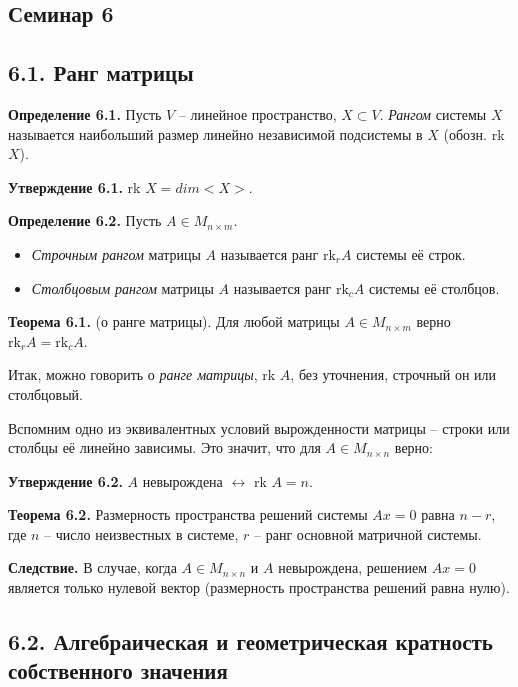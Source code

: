 \documentclass[a4paper, 12pt]{article}
\begin{document}
\begin{spacing}{1.5}
\setlength{\parindent}{0ex}

\section*{Семинар 6}


\subsection*{6.1. Ранг матрицы}

\textbf{Определение 6.1.} Пусть $V$ -- линейное пространство, $X \subset V$. \textit{Рангом} системы $X$ называется наибольший размер линейно независимой подсистемы в $X$ (обозн. rk $X$).

\textbf{Утверждение 6.1.} rk $X = dim <X>$.

\textbf{Определение 6.2.} Пусть $A \in M_{n \times m}$.
\begin{itemize}[noitemsep]
    \item \textit{Строчным рангом} матрицы $A$ называется ранг $\text{rk}_r A$ системы её строк.
    \item \textit{Столбцовым рангом} матрицы $A$ называется ранг $\text{rk}_c A$ системы её столбцов.
\end{itemize}

\textbf{Теорема 6.1.} (о ранге матрицы). Для любой матрицы $A \in M_{n \times m}$ верно $\text{rk}_r A = \text{rk}_c A$.

Итак, можно говорить о \textit{ранге матрицы}, rk $A$, без уточнения, строчный он или столбцовый.

Вспомним одно из эквивалентных условий вырожденности матрицы -- строки или столбцы её линейно зависимы. Это значит, что для $A \in M_{n \times n}$ верно:

\textbf{Утверждение 6.2.} $A$ невырождена $\leftrightarrow$ rk $A = n$.

\textbf{Теорема 6.2.} Размерность пространства решений системы $Ax = 0$ равна $n-r$, где $n$ -- число неизвестных в системе, $r$ -- ранг основной матричной системы.

\textbf{Следствие.} В случае, когда $A \in M_{n \times n}$ и $A$ невырождена, решением $Ax = 0$ является только нулевой вектор (размерность пространства решений равна нулю).


\subsection*{6.2. Алгебраическая и геометрическая кратность собственного значения}


\end{spacing}
\end{document}
